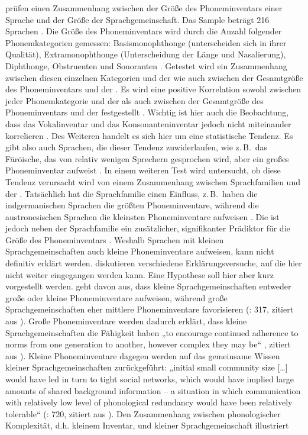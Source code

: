 \citet{HayBauer2007} prüfen einen Zusammenhang zwischen der Größe des Phoneminventars einer Sprache und der Größe der Sprachgemeinschaft. Das Sample beträgt 216 Sprachen \citep[388]{HayBauer2007}. Die Größe des Phoneminventars wird durch die Anzahl folgender Phonemkategorien gemessen: Basismonophthonge (unterscheiden sich in ihrer Qualität), Extramonophthonge (Unterscheidung der Länge und Nasalierung), Diphthonge, Obstruenten und Sonoranten \citep[389]{HayBauer2007}. Getestet wird ein Zusammenhang zwischen diesen einzelnen Kategorien und der  wie auch zwischen der Gesamtgröße des Phoneminventars und der . Es wird eine positive Korrelation sowohl zwischen jeder Phonemkategorie und der  als auch zwischen der Gesamtgröße des Phoneminventars und der  festgestellt \citep[389--390]{HayBauer2007}. Wichtig ist hier auch die Beobachtung, dass das Vokalinventar und das Konsonanteninventar jedoch nicht miteinander korrelieren \citep[391]{HayBauer2007}. Des Weiteren handelt es sich hier um eine statistische Tendenz. Es gibt also auch Sprachen, die dieser Tendenz zuwiderlaufen, wie z.\,B.\ das Färöische, das von relativ wenigen Sprechern gesprochen wird, aber ein großes Phoneminventar aufweist \citep[390]{HayBauer2007}. In einem weiteren Test wird untersucht, ob diese Tendenz verursacht wird von einem Zusammenhang zwischen Sprachfamilien und der  \citep[391]{HayBauer2007}. Tatsächlich hat die Sprachfamilie einen Einfluss, z.\,B.\ haben die indgermanischen Sprachen die größten Phoneminventare, während die austronesischen Sprachen die kleinsten Phoneminventare aufweisen \citep[392]{HayBauer2007}. Die  ist jedoch neben der Sprachfamilie ein zusätzlicher, signifikanter Prädiktor für die Größe des Phoneminventars \citep[392]{HayBauer2007}. Weshalb Sprachen mit kleinen Sprachgemeinschaften auch kleine Phoneminventare aufweisen, kann nicht definitiv erklärt werden. \citet{HayBauer2007} diskutieren verschiedene Erklärungsversuche, auf die hier nicht weiter eingegangen werden kann. Eine Hypothese soll hier aber kurz vorgestellt werden. \citet{Trudgill2004a} geht davon aus, dass kleine Sprachgemeinschaften entweder große oder kleine Phoneminventare aufweisen, während große Sprachgemeinschaften eher mittlere Phoneminventare favorisieren (\citealt{Trudgill2004a}: 317, zitiert aus \citealt[396]{HayBauer2007}). Große Phoneminventare werden dadurch erklärt, dass kleine Sprachgemeinschaften die Fähigkeit haben „to encourage continued adherence to norms from one generation to another, however complex they may be“ \citep[317]{Trudgill2004a}, zitiert aus \citealt[396]{HayBauer2007}). Kleine Phoneminventare dagegen werden auf das gemeinsame Wissen kleiner Sprachgemeinschaften zurückgeführt: „initial small community size […] would have led in turn to tight social networks, which would have implied large amounts of shared background information – a situation in which communication with relatively low level of phonological redundancy would have been relatively tolerable“ (\citealt[720]{Trudgill2002}: 720, zitiert aus \citealt[396]{HayBauer2007}). Den Zusammenhang zwischen phonologischer Komplexität, d.h. kleinem Inventar, und kleiner Sprachgemeinschaft illustriert 